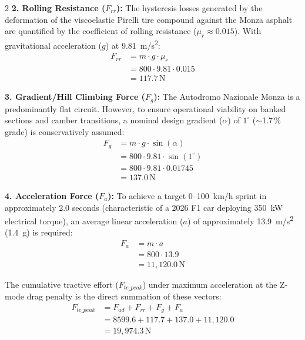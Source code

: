 \begin{multicols}{2}
\textbf{2. Rolling Resistance ($F_{rr}$):} The hysteresis losses generated by the deformation of the viscoelastic Pirelli tire compound against the Monza asphalt are quantified by the coefficient of rolling resistance ($\mu_r \approx 0.015$). With gravitational acceleration ($g$) at \SI{9.81}{m/s^2}:
\begin{equation} \label{eq:rolling_res}
\begin{split}
F_{rr} &= m \cdot g \cdot \mu_r \\
&= 800 \cdot 9.81 \cdot 0.015 \\
&= 117.7\,\mathrm{N}
\end{split}
\end{equation}

\textbf{3. Gradient/Hill Climbing Force ($F_{g}$):} The Autodromo Nazionale Monza is a predominantly flat circuit. However, to ensure operational viability on banked sections and camber transitions, a nominal design gradient ($\alpha$) of $1^\circ$ ($\sim$1.7\,\% grade) is conservatively assumed:
\begin{equation} \label{eq:gradient_force}
\begin{split}
F_{g} &= m \cdot g \cdot \sin(\alpha) \\
&= 800 \cdot 9.81 \cdot \sin(1^\circ) \\
&= 800 \cdot 9.81 \cdot 0.01745 \\
&= 137.0\,\mathrm{N}
\end{split}
\end{equation}

\textbf{4. Acceleration Force ($F_{a}$):} To achieve a target 0--\SI{100}{km/h} sprint in approximately 2.0 seconds (characteristic of a 2026 F1 car deploying \SI{350}{kW} electrical torque), an average linear acceleration ($a$) of approximately \SI{13.9}{m/s^2} (\SI{1.4}{g}) is required:
\begin{equation} \label{eq:accel_force}
\begin{split}
F_{a} &= m \cdot a \\
&= 800 \cdot 13.9 \\
&= 11{,}120.0\,\mathrm{N}
\end{split}
\end{equation}

The cumulative tractive effort ($F_{te\_peak}$) under maximum acceleration at the Z-mode drag penalty is the direct summation of these vectors:
\begin{equation} \label{eq:total_tractive}
\begin{split}
F_{te\_peak} &= F_{ad} + F_{rr} + F_{g} + F_{a} \\
&= 8599.6 + 117.7 + 137.0 + 11{,}120.0 \\
&= 19{,}974.3\,\mathrm{N}
\end{split}
\end{equation}
\end{multicols}

